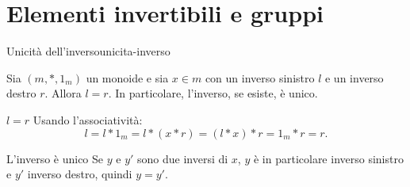 \section{Elementi invertibili e gruppi}\label{sec:invertibili}


\begin{concetto}
\begin{Teorema}{Unicità dell'inverso}{unicita-inverso}
    \begin{prerequisiti}
    \end{prerequisiti}
    Sia $(m, *, 1_m)$ un monoide e sia $x \in m$ con un inverso sinistro $l$ e un inverso destro $r$. Allora $l = r$.
    In particolare, l'inverso, se esiste, è unico.
\end{Teorema}
\begin{dimostrazione}
    \begin{caso}{$l = r$}
        Usando l'associatività:
        \[ l = l * 1_m = l * (x * r) = (l * x) * r = 1_m * r = r. \]
    \end{caso}
    \begin{caso}{L'inverso è unico}
        Se $y$ e $y'$ sono due inversi di $x$, $y$ è in particolare inverso sinistro e $y'$ inverso destro, quindi $y = y'$.
    \end{caso}
\end{dimostrazione}
\end{concetto}

